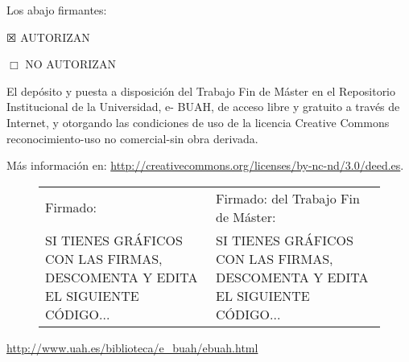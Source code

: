 Los abajo firmantes:

$\XBox$ AUTORIZAN

$\Box$ NO AUTORIZAN

\vspace{1cm}

\noindent El depósito y puesta a disposición del Trabajo Fin de Máster en el
Repositorio Institucional de la Universidad, e- BUAH, de acceso libre y
gratuito a través de Internet, y otorgando las condiciones de uso de la
licencia Creative Commons reconocimiento-uso no comercial-sin obra
derivada.

\noindent Más información en: \url{http://creativecommons.org/licenses/by-nc-nd/3.0/deed.es}.

\vspace{1cm}


\begin{figure}[H]
  \begin{tabular}{|p{}|p{}|}
    \hline
    \footnotesize{Firmado: \expandafter\makefirstuc\expandafter{\wordAutorElOrLa} \wordAutorOrAutora{}} & Firmado: \footnotesize{\wordElOrLos{} \wordTutorOrTutores{} del Trabajo Fin de Máster:}\\

  SI TIENES GRÁFICOS CON LAS FIRMAS, DESCOMENTA Y EDITA EL SIGUIENTE
  CÓDIGO...
& 
  SI TIENES GRÁFICOS CON LAS FIRMAS, DESCOMENTA Y EDITA EL SIGUIENTE
  CÓDIGO...
 \\
    \hline
  \end{tabular}
\end{figure}

\vspace{1cm}
\noindent \url{http://www.uah.es/biblioteca/e\_buah/ebuah.html}



